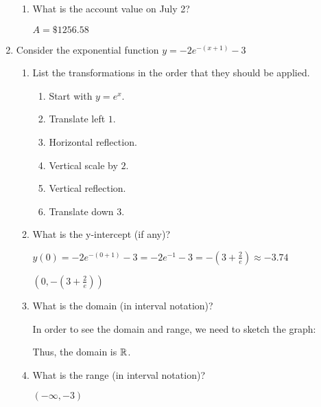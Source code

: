 \documentclass[letterpaper,12pt,fleqn]{article}
\begin{document}
\begin{enumerate}
\begin{enumerate}
  \item What is the account value on July 2?

    $A=\$1256.58$
  \end{enumerate}

\item Consider the exponential function $y=-2e^{-(x+1)}-3$
  \begin{enumerate}
  \item List the transformations in the order that they should be applied.

    \begin{enumerate}
    \item Start with $y=e^x$.
    \item Translate left $1$.
    \item Horizontal reflection.
    \item Vertical scale by $2$.
    \item Vertical reflection.
    \item Translate down $3$.
    \end{enumerate}
    
  \item What is the y-intercept (if any)?

    $y(0)=-2e^{-(0+1)}-3=-2e^{-1}-3=-\left(3+\frac{2}{e}\right)\approx-3.74$

    $\left(0,-\left(3+\frac{2}{e}\right)\right)$
    
  \item What is the domain (in interval notation)?

    In order to see the domain and range, we need to sketch the graph:


    Thus, the domain is $\mathbb{R}$.
    
  \item What is the range (in interval notation)?

    $(-\infty,-3)$
    

\end{enumerate}
\end{enumerate}
\end{document}
